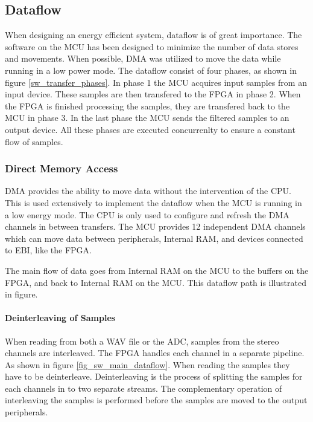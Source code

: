
\subsection{Dataflow}
\newpage
When designing an energy efficient system, dataflow is of great importance. The
software on the MCU has been designed to minimize the number of data stores and
movements. When possible, DMA was utilized to move the data while running in a
low power mode. The dataflow consist of four phases, as shown in figure \ref{sw_transfer_phases}. 
In phase 1 the MCU acquires input samples from an input device. These samples are 
then transfered to the FPGA in phase 2. When the FPGA is finished processing the
samples, they are transfered back to the MCU in phase 3. In the last phase the MCU
sends the filtered samples to an output device. All these phases are executed 
concurrenlty to ensure a constant flow of samples. 



\subsubsection{Direct Memory Access} DMA provides the ability to move data
without the intervention of the CPU. This is used extensively to implement the
dataflow when the MCU is running in a low energy mode. The CPU is only used to configure
and refresh the DMA channels in between transfers. The MCU provides 12
independent DMA channels which can move data between peripherals, Internal RAM, and
devices connected to EBI, like the FPGA.

The main flow of data goes from Internal RAM on the MCU to the buffers on
the FPGA, and back to Internal RAM on the MCU. This dataflow path is illustrated in figure.

% 

\paragraph{Deinterleaving of Samples}
When reading from both a WAV file or the ADC, samples from the stereo channels
are interleaved. The FPGA handles each channel in a separate pipeline. As shown 
in figure \ref{fig_sw_main_dataflow}. 
When reading the samples they have to be deinterleave. Deinterleaving is the
process of splitting the samples for each channels in to two separate streams. 
The complementary operation of interleaving the samples is performed before the samples 
are moved to the output peripherals.

